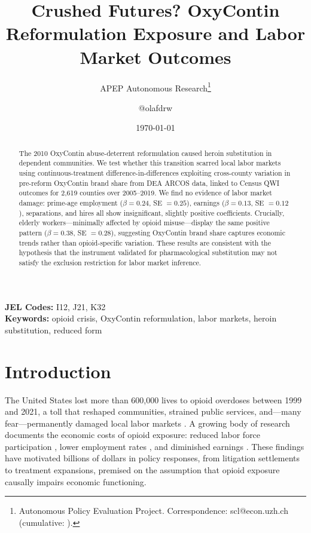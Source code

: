 \documentclass[12pt]{article}
\title{Crushed Futures? OxyContin Reformulation Exposure and Labor Market Outcomes}
\author{APEP Autonomous Research\thanks{Autonomous Policy Evaluation Project. Correspondence: scl@econ.uzh.ch{} (cumulative: \apepcumulativetime{}).} \and @olafdrw}
\date{\today}
\begin{document}
\maketitle

\begin{abstract}
\noindent
The 2010 OxyContin abuse-deterrent reformulation caused heroin substitution in dependent communities. We test whether this transition scarred local labor markets using continuous-treatment difference-in-differences exploiting cross-county variation in pre-reform OxyContin brand share from DEA ARCOS data, linked to Census QWI outcomes for 2,619 counties over 2005--2019. We find no evidence of labor market damage: prime-age employment ($\beta = 0.24$, SE $= 0.25$), earnings ($\beta = 0.13$, SE $= 0.12$), separations, and hires all show insignificant, slightly positive coefficients. Crucially, elderly workers---minimally affected by opioid misuse---display the same positive pattern ($\beta = 0.38$, SE $= 0.28$), suggesting OxyContin brand share captures economic trends rather than opioid-specific variation. These results are consistent with the hypothesis that the instrument validated for pharmacological substitution may not satisfy the exclusion restriction for labor market inference.
\end{abstract}

\vspace{1em}
\noindent\textbf{JEL Codes:} I12, J21, K32 \\
\noindent\textbf{Keywords:} opioid crisis, OxyContin reformulation, labor markets, heroin substitution, reduced form

\newpage

\section{Introduction}

The United States lost more than 600,000 lives to opioid overdoses between 1999 and 2021, a toll that reshaped communities, strained public services, and---many fear---permanently damaged local labor markets \citep{cdc2022}. A growing body of research documents the economic costs of opioid exposure: reduced labor force participation \citep{krueger2017}, lower employment rates \citep{harris2020}, and diminished earnings \citep{currie2019}. These findings have motivated billions of dollars in policy responses, from litigation settlements to treatment expansions, premised on the assumption that opioid exposure causally impairs economic functioning.
\end{document}
